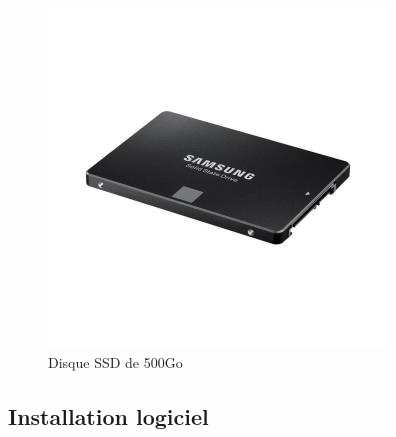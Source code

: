 \documentclass[12pt, a4paper, twoside]{article}
\begin{document}
\begin{figure}[!h]
\begin{minipage}[b]{0.45\textwidth}
        \includegraphics[width=\textwidth,height=\textheight,keepaspectratio]{src/img_ssd.jpg}
        \caption{Disque SSD de 500Go}
        \label{fig:ssd_disk}
    \end{minipage}%
\end{figure}

\newpage
\subsection{Installation logiciel}
\end{document}
